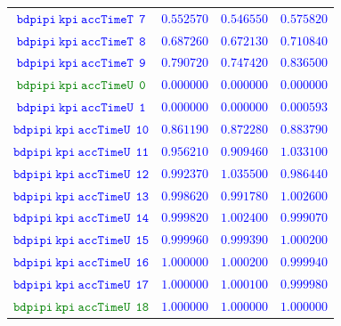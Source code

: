 \documentclass[10pt,a4paper]{article}
\begin{document}
\begin{table}[h!]
{\begin{tabular}{cccc}
\textcolor{blue}{$\mathtt{bdpipi~kpi~accTimeT~~7}$} & \textcolor{blue}{$0.552570$}& \textcolor{blue}{$0.546550$}& \textcolor{blue}{$0.575820$}\\
\textcolor{blue}{$\mathtt{bdpipi~kpi~accTimeT~~8}$} & \textcolor{blue}{$0.687260$}& \textcolor{blue}{$0.672130$}& \textcolor{blue}{$0.710840$}\\
\textcolor{blue}{$\mathtt{bdpipi~kpi~accTimeT~~9}$} & \textcolor{blue}{$0.790720$}& \textcolor{blue}{$0.747420$}& \textcolor{blue}{$0.836500$}\\
\textcolor{Green}{$\mathtt{bdpipi~kpi~accTimeU~~0}$} & \textcolor{blue}{$0.000000$}& \textcolor{blue}{$0.000000$}& \textcolor{blue}{$0.000000$}\\
\textcolor{blue}{$\mathtt{bdpipi~kpi~accTimeU~~1}$} & \textcolor{blue}{$0.000000$}& \textcolor{blue}{$0.000000$}& \textcolor{blue}{$0.000593$}\\
\textcolor{blue}{$\mathtt{bdpipi~kpi~accTimeU~~10}$} & \textcolor{blue}{$0.861190$}& \textcolor{blue}{$0.872280$}& \textcolor{blue}{$0.883790$}\\
\textcolor{blue}{$\mathtt{bdpipi~kpi~accTimeU~~11}$} & \textcolor{blue}{$0.956210$}& \textcolor{blue}{$0.909460$}& \textcolor{blue}{$1.033100$}\\
\textcolor{blue}{$\mathtt{bdpipi~kpi~accTimeU~~12}$} & \textcolor{blue}{$0.992370$}& \textcolor{blue}{$1.035500$}& \textcolor{blue}{$0.986440$}\\
\textcolor{blue}{$\mathtt{bdpipi~kpi~accTimeU~~13}$} & \textcolor{blue}{$0.998620$}& \textcolor{blue}{$0.991780$}& \textcolor{blue}{$1.002600$}\\
\textcolor{blue}{$\mathtt{bdpipi~kpi~accTimeU~~14}$} & \textcolor{blue}{$0.999820$}& \textcolor{blue}{$1.002400$}& \textcolor{blue}{$0.999070$}\\
\textcolor{blue}{$\mathtt{bdpipi~kpi~accTimeU~~15}$} & \textcolor{blue}{$0.999960$}& \textcolor{blue}{$0.999390$}& \textcolor{blue}{$1.000200$}\\
\textcolor{blue}{$\mathtt{bdpipi~kpi~accTimeU~~16}$} & \textcolor{blue}{$1.000000$}& \textcolor{blue}{$1.000200$}& \textcolor{blue}{$0.999940$}\\
\textcolor{blue}{$\mathtt{bdpipi~kpi~accTimeU~~17}$} & \textcolor{blue}{$1.000000$}& \textcolor{blue}{$1.000100$}& \textcolor{blue}{$0.999980$}\\
\textcolor{Green}{$\mathtt{bdpipi~kpi~accTimeU~~18}$} & \textcolor{blue}{$1.000000$}& \textcolor{blue}{$1.000000$}& \textcolor{blue}{$1.000000$}\\

\end{tabular}}
\end{table}
\end{document}
